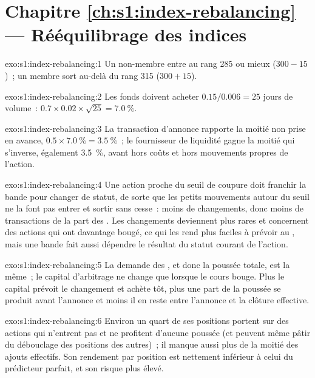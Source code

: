 \section*{Chapitre \ref{ch:s1:index-rebalancing} --- Rééquilibrage des indices}

\begin{solution}{exo:s1:index-rebalancing:1}
Un non-membre entre au rang 285 ou mieux ($300 - 15$)~; un membre sort au-delà du rang 315 ($300 + 15$).
\end{solution}

\begin{solution}{exo:s1:index-rebalancing:2}
Les fonds doivent acheter $0.15/0.006 = 25$ jours de volume~: $0.7 \times 0.02 \times \sqrt{25} = 7.0~\%$.
\end{solution}

\begin{solution}{exo:s1:index-rebalancing:3}
La transaction d'annonce rapporte la moitié non prise en avance, $0.5 \times 7.0~\% = 3.5~\%$~; le fournisseur de liquidité gagne la moitié qui s'inverse, également 3.5~\%, avant
hors coûts et hors mouvements propres de l'action.
\end{solution}

\begin{solution}{exo:s1:index-rebalancing:4}
Une action proche du seuil de coupure doit franchir la bande pour changer de statut, de sorte que les petits mouvements autour du seuil ne la font pas entrer et sortir sans cesse~: moins de changements, donc moins de transactions
de la part des . Les changements deviennent plus rares et concernent des actions qui ont davantage bougé, ce qui les rend plus faciles à prévoir au , mais une bande fait aussi dépendre
le résultat du statut courant de l'action.
\end{solution}

\begin{solution}{exo:s1:index-rebalancing:5}
La demande des , et donc la poussée totale, est la même~; le capital d'arbitrage ne change que lorsque le cours bouge. Plus le capital prévoit le changement et
achète tôt, plus une part de la poussée se produit avant l'annonce et moins il en reste entre l'annonce et la clôture effective.
\end{solution}

\begin{solution}{exo:s1:index-rebalancing:6}
Environ un quart de ses positions portent sur des actions qui n'entrent pas et ne profitent d'aucune poussée (et peuvent même pâtir du débouclage des positions des autres)~; il manque aussi
plus de la moitié des ajouts effectifs. Son rendement par position est nettement inférieur à celui du prédicteur parfait, et son risque plus élevé.
\end{solution}

